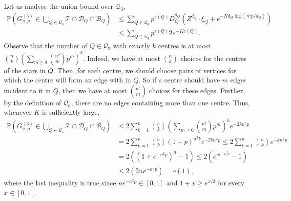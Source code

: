 \documentclass[11pt,a4paper,oneside,reqno]{amsart}
\newcommand{\Gnp}{G_{n, p}^{(3)}}
\newcommand{\cB}{\mathcal{B}}
\newcommand{\cD}{\mathcal{D}}
\newcommand{\cQ}{\mathcal{Q}}
\newcommand{\cT}{\mathcal{T}}
\renewcommand{\Pr}{\mathbb{P}}
\newcommand{\1}{\mathbbm{1}} %
\renewcommand{\le}{\leqslant}
\renewcommand{\ge}{\geqslant}
\begin{document}

Let us analyse the union bound over $\cQ_3$, 
\begin{align*}
    \Pr\left(\Gnp \in \bigcup_{Q \in \cQ_3} \cT \cap \cD_Q \cap \cB_Q\right) &\le \sum_{Q \in \cQ_3} p^{e(Q)} D_Q^{d_Q}\left(Z^{d_Q} \cdot \xi_Q + e^{-K d_Q \log(n^3 p / d_Q)}\right) \\
    &\le \sum_{Q \in \cQ_3} p^{e(Q)} 2e^{-K e(Q)}.
\end{align*}
Observe that the number of $Q \in \cQ_3$ with exactly $k$ centres is at most $\binom{n}{k} \left(\sum_{m \ge 0} \binom{n^2}{m} p^m\right)^k$. Indeed, we have at most $\binom{n}{k}$ choices for the centres of the stars in $Q$. Then, for each centre, we should choose pairs of vertices for which the centre will form an edge with in $Q$. So if a centre should have $m$ edges incident to it in $Q$, then we have at most $\binom{n^2}{m}$ choices for these edges. Further, by the definition of $\cQ_3$, there are no edges containing more than one centre. Thus, whenever $K$ is sufficiently large,
\begin{align*}
    \Pr\left(\Gnp \in \bigcup_{Q \in \cQ_3} \cT \cap \cD_Q \cap \cB_Q\right) &\le 2\sum_{k=1}^n \binom{n}{k} \left(\sum_{m \ge 0} \binom{n^2}{m} p^m\right)^k e^{-2k n^2 p} \\
    &= 2\sum_{k=1}^n \binom{n}{k} \left(1 + p\right)^{n^2 k} e^{-2k n^2 p} 
    \le 2\sum_{k=1}^n \binom{n}{k} e^{-k n^2 p} \\
    &= 2\left((1 + e^{-n^2 p})^n - 1\right)
    \le 2\left(e^{n e^{-n^2 p}} - 1\right)
    \\&\le 2\left(2n e^{-n^2 p}\right) = o(1),
\end{align*}
where the last inequality is true since $n e^{-n^2 p} \in [0, 1]$ and $1 + x \ge e^{x/2}$ for every $x \in [0, 1]$.
\end{document}
